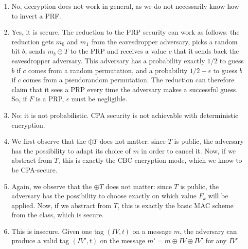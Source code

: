 \begin{solution}
\begin{enumerate}
\item No, decryption does not work in general, as we do not
	necessarily know how to invert a PRF.
	
\item 	Yes, it is secure.  The reduction to the PRP security can work as follows:
	the reduction gets $m_0$ and $m_1$ from the eavesdropper
	adversary, picks a random bit $b$, sends $m_b \oplus T$ to the
	PRP and receives a value $c$ that it sends back the eavesdropper
	adversary. This adversary has a probability exactly $1/2$ to
	guess $b$ if $c$ comes from a random permutation, and a
	probability $1/2 + \epsilon$ to guess $b$ if $c$ comes from a
	pseudorandom permutation. The reduction can therefore claim that
	it sees a PRP every time the adversary makes a successful
	guess. So, if $F$ is a PRP, $\epsilon$ must be negligible.

\item 	No: it is not probabilistic. CPA security is not achievable with deterministic encryption. 

\item We first observe that the $\oplus T$ does not matter:
since $T$ is public, the adversary has the possibility to adapt
its choice of $m$ in order to cancel it.  Now, if we abstract
from $T$, this is exactly the CBC encryption mode, which we know
to be CPA-secure.
\item Again, we observe that the $\oplus T$ does not matter: since
$T$ is public, the adversary has the possibility to choose exactly
on which value $F_k$ will be applied. Now, if we abstract from $T$,
this is exactly the basic MAC scheme from the class, which is secure.
\item This is insecure. Given one tag $(IV, t)$ on a message
$m$, the adversary can produce a valid tag $(IV', t)$ on the
message $m' = m \oplus IV \oplus IV'$ for any $IV'$.
	
\end{enumerate}
\end{solution}





